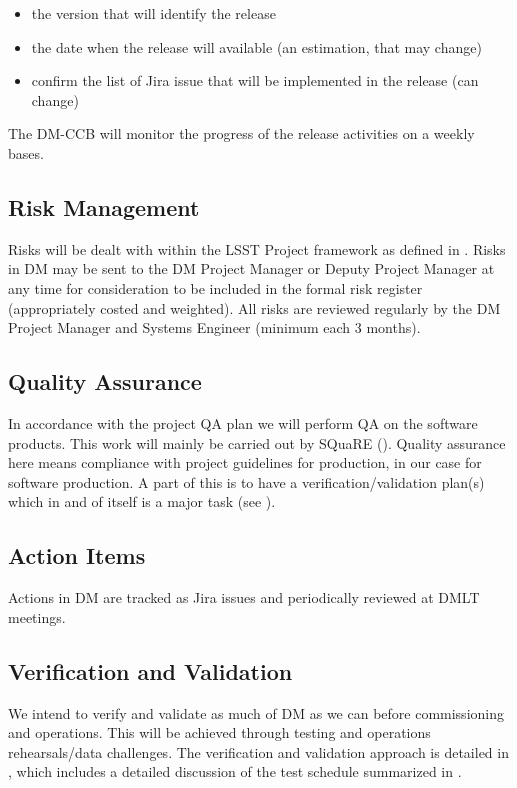 \begin{itemize}
\item the version that will identify the release
\item the date when the release will available (an estimation, that may change)
\item confirm the list of Jira issue that will be implemented in the release (can change)
\end{itemize}

The DM-CCB will monitor the progress of the release activities on a weekly bases.

\subsection {Risk Management } \label{sect:risk}

Risks will be dealt with within the LSST Project framework as defined in .
Risks in DM may be sent to the DM Project Manager or Deputy Project Manager at any time for consideration to be included in the formal risk register (appropriately costed and weighted). All risks are reviewed regularly by the DM Project Manager and Systems Engineer (minimum each 3 months).


\subsection {Quality Assurance  } \label{sect:pa}

In accordance with the project QA plan  we will perform QA on the software products.
This work will mainly be carried out by SQuaRE ().
Quality assurance here means compliance with project guidelines for production, in our case for software production.
A part of this is to have a verification/validation plan(s) which in and of itself is a major task (see ).


\subsection{Action Items }
Actions in DM are tracked as Jira issues and periodically reviewed at DMLT meetings.


\subsection {Verification and Validation } \label{sect:vanv}

We intend to verify and validate as much of DM as we can before commissioning and operations.
This will be achieved through testing and operations rehearsals/data challenges.
The verification and validation approach is detailed in , which includes a detailed discussion of the test schedule summarized in .

